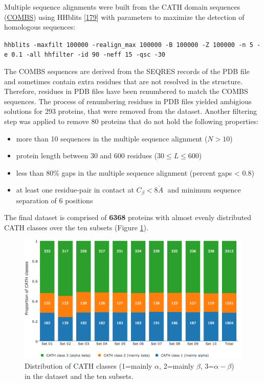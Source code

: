 \documentclass[11pt,a4paper,twoside]{book}
\providecommand{\tightlist}{%
  \setlength{\itemsep}{0pt}\setlength{\parskip}{0pt}}
\newcommand{\angstrom}{\mathring{A} \;}
\theoremstyle{definition}
\theoremstyle{definition}
\theoremstyle{remark}
\begin{document}
Multiple sequence alignments were built from the CATH domain sequences
(\href{http://www.cathdb.info/version/current/domain/3cdjA03/sequence}{COMBS})
using HHblits {[}\protect\hyperlink{ref-Remmert2012}{179}{]} with
parameters to maximize the detection of homologous sequences:

\texttt{hhblits\ -maxfilt\ 100000\ -realign\_max\ 100000\ -B\ 100000\ -Z\ 100000\ -n\ 5\ -e\ 0.1\ -all\ hhfilter\ -id\ 90\ -neff\ 15\ -qsc\ -30}

The COMBS sequences are derived from the SEQRES records of the PDB file
and sometimes contain extra residues that are not resolved in the
structure. Therefore, residues in PDB files have been renumbered to
match the COMBS sequences. The process of renumbering residues in PDB
files yielded ambigious solutions for 293 proteins, that were removed
from the dataset. Another filtering step was applied to remove 80
proteins that do not hold the following properties:

\begin{itemize}
\tightlist
\item
  more than 10 sequences in the multiple sequence alignment (\(N>10\))
\item
  protein length between 30 and 600 residues (\(30 \leq L \leq 600\))
\item
  less than 80\% gaps in the multiple sequence alignment (percent gaps
  \textless{} 0.8)
\item
  at least one residue-pair in contact at \(C_\beta < 8\angstrom\) and
  minimum sequence separation of 6 positions
\end{itemize}

The final dataset is comprised of \textbf{6368} proteins with almost
evenly distributed CATH classes over the ten subsets (Figure
\ref{fig:dataset-cath-topologies}).





\begin{figure}
\includegraphics[width=1\linewidth]{img/dataset_statistics/cath_topologies_stacked_reative_notitle} \caption{Distribution of CATH classes
(1=mainly \(\alpha\), 2=mainly \(\beta\), 3=\(\alpha-\beta\)) in the
dataset and the ten subsets. }\label{fig:dataset-cath-topologies}
\end{figure}
\end{document}
